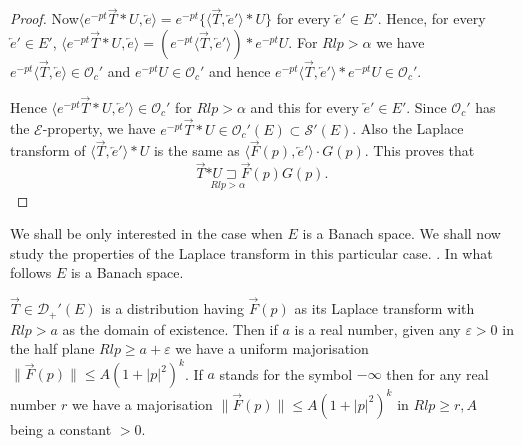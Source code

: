 \begin{proof}
Now\pageoriginale $\langle e^{-pt}\overrightarrow{T} * U,
\overleftarrow{e}\rangle = e^{-pt} \{\langle\overrightarrow{T},
\overleftarrow{e}'\rangle * U\}$ for every $\overleftarrow{e}' \in
E'$. Hence, for every $\overleftarrow{e}' \in E'$, $\langle e^{-pt}
\overrightarrow{T} * U, \overleftarrow{e}\rangle = (e^{-pt}\langle
\overrightarrow{T}, \overleftarrow{e}'\rangle )* e^{-pt}U$. For $Rl p
> \alpha$ we have $e^{-pt}\langle \overrightarrow{T},
\overleftarrow{e}\rangle \in \mathscr{O}_c'$ and $e^{-pt} U \in
\mathscr{O}_c'$ and hence $e^{-pt} \langle \overrightarrow{T},
\overleftarrow{e}' \rangle * e^{-pt} U \in \mathscr{O}_c'$.

Hence $\langle e^{-pt} \overrightarrow{T} * U,\overleftarrow{e}'
\rangle \in \mathscr{O}_c'$ for $Rl p > \alpha$ and this for
every $\overleftarrow{e}' \in E'$. Since $\mathscr{O}_c'$ has the
$\mathcal{E}$-property, we have $e^{-pt} \overrightarrow{T} * U \in
\mathscr{O}_c' (E) \subset \mathscr{S}'(E)$. Also the Laplace
transform of $\langle \overrightarrow{T}, \overleftarrow{e}' \rangle *
U$ is the same as $\langle \overrightarrow{F}(p), \overleftarrow{e}'
\rangle \cdot G(p)$. This proves that
$$
\overrightarrow{T} \underset{Rl p> \alpha}{* U \sqsupset
  \overrightarrow{F}}(p) G(p).
$$  
\end{proof}

We shall be only interested in the case when $E$ is a Banach space. We
shall now study the properties of the Laplace transform in this
particular case.
. In what follows $E$ is a Banach space.
\begin{prop}\label{chap9:prop9.5}
$\overrightarrow{T} \in \mathscr{D}_+'(E)$ is a distribution having
  $\overrightarrow{F}(p)$ as its Laplace transform with $Rl p > a$ as
  the domain of existence. Then if $a$ is a real number, given any
  $\varepsilon > 0$ in the half plane $Rl p \geq a + \varepsilon$ we
  have a uniform majorisation $\parallel
  \overrightarrow{F}(p)\parallel \leq A(1+|p|^2)^k$. If $a$ stands for
  the symbol $-\infty$ then for any real number $r$ we have a
  majorisation $\parallel \overrightarrow{F}(p)\parallel\leq
  A(1+|p|^2)^k$ in $Rl p \geq r, A$ being a constant $>0$.
\end{prop}

